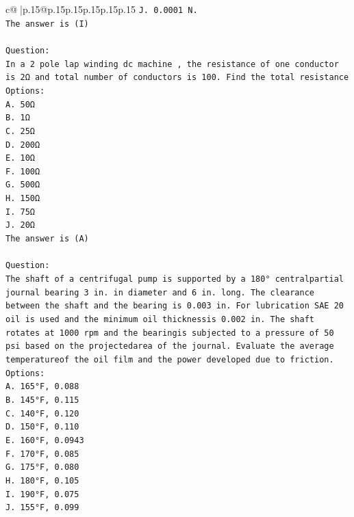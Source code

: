 \documentclass{article}
\begin{document}
{\begin{supertabular}{c@{$\;$}|p{.15\linewidth}@{}p{.15\linewidth}p{.15\linewidth}p{.15\linewidth}p{.15\linewidth}p{.15\linewidth}}
{{{\texttt{J. 0.0001 N.} \\
\texttt{The answer is (I)} \\
\\ 
\texttt{Question:} \\
\texttt{In a 2 pole lap winding dc machine , the resistance of one conductor is 2Ω and total number of conductors is 100. Find the total resistance} \\
\texttt{Options:} \\
\texttt{A. 50Ω} \\
\texttt{B. 1Ω} \\
\texttt{C. 25Ω} \\
\texttt{D. 200Ω} \\
\texttt{E. 10Ω} \\
\texttt{F. 100Ω} \\
\texttt{G. 500Ω} \\
\texttt{H. 150Ω} \\
\texttt{I. 75Ω} \\
\texttt{J. 20Ω} \\
\texttt{The answer is (A)} \\
\\ 
\texttt{Question:} \\
\texttt{The shaft of a centrifugal pump is supported by a 180° centralpartial journal bearing 3 in. in diameter and 6 in. long. The clearance between the shaft and the bearing is 0.003 in. For lubrication SAE 20 oil is used and the minimum oil thicknessis 0.002 in. The shaft rotates at 1000 rpm and the bearingis subjected to a pressure of 50 psi based on the projectedarea of the journal. Evaluate the average temperatureof the oil film and the power developed due to friction.} \\
\texttt{Options:} \\
\texttt{A. 165°F, 0.088} \\
\texttt{B. 145°F, 0.115} \\
\texttt{C. 140°F, 0.120} \\
\texttt{D. 150°F, 0.110} \\
\texttt{E. 160°F, 0.0943} \\
\texttt{F. 170°F, 0.085} \\
\texttt{G. 175°F, 0.080} \\
\texttt{H. 180°F, 0.105} \\
\texttt{I. 190°F, 0.075} \\
\texttt{J. 155°F, 0.099} \\
            }
        }
    }
     \\ \\


\end{supertabular}}
\end{document}
